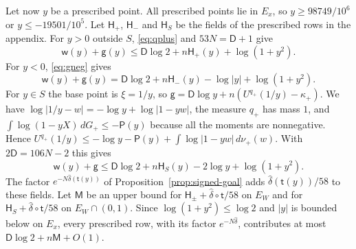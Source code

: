 \documentclass[11pt]{amsart}
\theoremstyle{definition}
\theoremstyle{remark}
\numberwithin{equation}{section}
\begin{document}
Let now $y$ be a prescribed point. All prescribed points lie in $E_x$, so $y\ge98749/10^6$ or $y\le-19501/10^5$. Let $\mathsf H_+$, $\mathsf H_-$ and $\mathsf H_S$ be the fields of the prescribed rows in
the appendix. For $y>0$ outside $S$, \eqref{eq:qplus} and $53N=\mathsf D+1$ give
\[
 \mathsf w(y)+\mathsf g(y)\le \mathsf D\log2+n\mathsf H_+(y)+\log(1+y^2).
\]
For $y<0$, \eqref{eq:gneg} gives
\[
 \mathsf w(y)+\mathsf g(y)=\mathsf D\log2+n\mathsf H_-(y)-\log|y|+\log(1+y^2).
\]
For $y\in S$ the base point is $\xi=1/y$, so $\mathsf g=\mathsf D\log y+n(U^{q_+}(1/y)-\kappa_+)$. We have $\log|1/y-w|=-\log y+\log|1-yw|$, the measure $q_+$ has mass $1$, and $\int\log(1-yX)\,dG_+\le-\mathsf P(y)$
because all the moments are nonnegative. Hence $U^{q_+}(1/y)\le-\log y-\mathsf P(y)+\int\log|1-yw|\,d\nu_+(w)$. With $2\mathsf D=106N-2$ this gives
\[
 \mathsf w(y)+\mathsf g\le \mathsf D\log2+n\mathsf H_S(y)-2\log y+\log(1+y^2).
\]
The factor $e^{-N\hat\delta(\mathsf t(y))}$ of Proposition~\ref{prop:signed-goal} adds $\hat\delta(\mathsf t(y))/58$ to these fields. Let $\mathsf M$ be an upper bound for $\mathsf H_\pm+\hat\delta\circ\mathsf t/58$ on $E_W$ and for $\mathsf H_S+\hat\delta\circ\mathsf t/58$ on $E_W\cap(0,1)$. Since $\log(1+y^2)\le\log2$ and $|y|$ is bounded below on $E_x$, every prescribed row, with its factor $e^{-N\hat\delta}$, contributes at most
$\mathsf D\log2+n\mathsf M+O(1)$.
\end{document}
